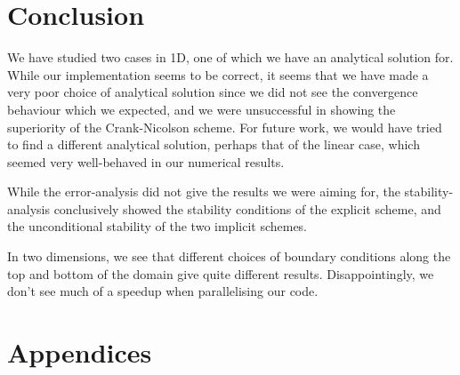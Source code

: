 \documentclass[10pt,a4paper]{article}
\begin{document}
\section{Conclusion}
We have studied two cases in 1D, one of which we have an analytical solution for. While our implementation seems to be correct, it seems that we have made a very poor choice of analytical solution since we did not see the convergence behaviour which we expected, and we were unsuccessful in showing the superiority of the Crank-Nicolson scheme. For future work, we would have tried to find a different analytical solution, perhaps that of the linear case, which seemed very well-behaved in our numerical results.

While the error-analysis did not give the results we were aiming for, the stability-analysis conclusively showed the stability conditions of the explicit scheme, and the unconditional stability of the two implicit schemes.

In two dimensions, we see that different choices of boundary conditions along the top and bottom of the domain give quite different results. Disappointingly, we don't see much of a speedup when parallelising our code.



{}

\newpage
\appendix
\section*{\Huge{Appendices}}




\end{document}
